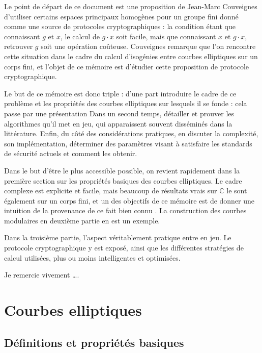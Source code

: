 \documentclass[11pt,a4paper]{article}
\newcommand{\C}{\mathbb{C}}
\theoremstyle{definition}
\begin{document}
Le point de départ de ce document est une proposition de Jean-Marc Couveignes \cite{Couv} d'utiliser certains espaces principaux homogènes pour un groupe fini donné comme une source de protocoles cryptographiques : la condition étant que connaissant $g$ et $x$, le calcul de $g\cdot x$ soit facile, mais que connaissant $x$ et $g\cdot x$, retrouver $g$ soit une opération coûteuse. Couveignes remarque que l'on rencontre cette situation dans le cadre du calcul d'isogénies entre courbes elliptiques sur un corps fini, et l'objet de ce mémoire est d'étudier cette proposition de protocole cryptographique.

Le but de ce mémoire est donc triple : d'une part introduire le cadre de ce problème et les propriétés des courbes elliptiques sur lesquels il se fonde : cela passe par une présentation  Dans un second temps, détailler et prouver les algorithmes qu'il met en jeu, qui apparaissent souvent disséminés dans la littérature. Enfin, du côté des considérations pratiques, en discuter la complexité, son implémentation, déterminer des paramètres visant à satisfaire les standards de sécurité actuels et comment les obtenir.

Dans le but d'être le plus accessible possible, on revient rapidement dans la première section sur les propriétés basiques des courbes elliptiques. Le cadre complexe est explicite et facile, mais beaucoup de résultats vrais sur $\C$ le sont également sur un corps fini, et un des objectifs de ce mémoire est de donner une intuition de la provenance de ce fait \og bien connu \fg. La construction des courbes modulaires en deuxième partie en est un exemple.

Dans la troisième partie, l'aspect véritablement pratique entre en jeu. Le protocole cryptographique y est exposé, ainsi que les différentes stratégies de calcul utilisées, plus ou moins intelligentes et optimisées. 

Je remercie vivement \ldots.

\newpage

\tableofcontents

\newpage

\section{Courbes elliptiques}


\subsection{Définitions et propriétés basiques}
\end{document}
